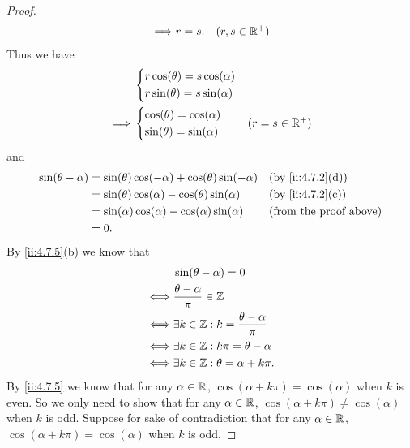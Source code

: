 \begin{proof}
\begin{align*}
    \implies & r = s.                                                                                                                                & (r, s \in \mathbb{R}^+)
  \end{align*}
  Thus we have
  \begin{align*}
             & \begin{dcases}
                 r \cos(\theta) = s \cos(\alpha) \\
                 r \sin(\theta) = s \sin(\alpha)
               \end{dcases}     \\
    \implies & \begin{dcases}
                 \cos(\theta) = \cos(\alpha) \\
                 \sin(\theta) = \sin(\alpha)
               \end{dcases}     & (r = s \in \mathbb{R}^+)
  \end{align*}
  and
  \begin{align*}
    \sin(\theta - \alpha) & = \sin(\theta) \cos(-\alpha) + \cos(\theta) \sin(-\alpha) &  & \by{ii:4.7.2}[d]              \\
                          & = \sin(\theta) \cos(\alpha) - \cos(\theta) \sin(\alpha)   &  & \by{ii:4.7.2}[c]              \\
                          & = \sin(\alpha) \cos(\alpha) - \cos(\alpha) \sin(\alpha)   &  & \text{(from the proof above)} \\
                          & = 0.
  \end{align*}
  By \cref{ii:4.7.5}(b) we know that
  \begin{align*}
         & \sin(\theta - \alpha) = 0                           \\
    \iff & \dfrac{\theta - \alpha}{\pi} \in \mathbb{Z}                 \\
    \iff & \exists k \in \mathbb{Z} : k = \dfrac{\theta - \alpha}{\pi} \\
    \iff & \exists k \in \mathbb{Z} : k \pi = \theta - \alpha          \\
    \iff & \exists k \in \mathbb{Z} : \theta = \alpha + k \pi.
  \end{align*}
  By \cref{ii:4.7.5} we know that for any \(\alpha \in \mathbb{R}\), \(\cos(\alpha + k \pi) = \cos(\alpha)\) when \(k\) is even.
  So we only need to show that for any \(\alpha \in \mathbb{R}\), \(\cos(\alpha + k \pi) \neq \cos(\alpha)\) when \(k\) is odd.
  Suppose for sake of contradiction that for any \(\alpha \in \mathbb{R}\), \(\cos(\alpha + k \pi) = \cos(\alpha)\) when \(k\) is odd.

\end{proof}
